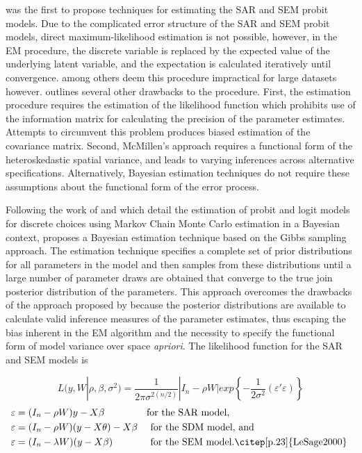 \cite{McMillen1992} was the first to propose techniques for estimating the SAR and SEM probit models.  Due to the complicated error structure of the SAR and SEM probit models, direct maximum-likelihood estimation is not possible, however, in the EM procedure, the discrete variable is replaced by the expected value of the underlying latent variable, and the expectation is calculated iteratively until convergence.  \cite{McMillen1992} among others deem this procedure impractical for large datasets however.  \cite{LeSage2000} outlines several other drawbacks to the procedure.  First, the estimation procedure requires the estimation of the likelihood function which prohibits  use of the information matrix for calculating the precision of the parameter estimates.  Attempts to circumvent this problem produces biased estimation of the covariance matrix.  Second, McMillen's approach requires a functional form of the heteroskedastic spatial variance, and leads to varying inferences across alternative specifications.  Alternatively, Bayesian estimation techniques do not require these assumptions about the functional form of the error process.

Following the work of \cite{Chib1992} and \cite{Albert1993} which detail the estimation of probit and logit models for discrete choices using Markov Chain Monte Carlo estimation in a Bayesian context, \cite{LeSage2000} proposes a Bayesian estimation  technique based on the Gibbs sampling approach.  The estimation technique specifies a complete set of prior distributions for all parameters in the model and then samples from these distributions until a large number of parameter draws are obtained that converge to the true join posterior distribution of the parameters.  This approach overcomes the drawbacks of the approach proposed by \cite{McMillen1992} because the posterior distributions are available to calculate valid inference measures of the parameter estimates, thus escaping the bias inherent in the EM algorithm and the necessity to specify the functional form of model variance over space \textit{apriori}. The likelihood function for the SAR and SEM models is

\begin{equation} \label{sarlikelihood}
 L(y,W|\rho,\beta ,\sigma^2)=\dfrac{1}{2\pi\sigma^{2(n/2)}}|I_n - \rho W|exp \left\lbrace -\frac{1}{2\sigma^2}(\varepsilon'\varepsilon)\right\rbrace 
\end{equation}
% 
\begin{align*}
 \varepsilon &= (I_n - \rho W)y - X\beta \qquad \qquad  \text{ for the SAR model,} \\
 \varepsilon &= (I_n - \rho W)(y - X\theta) - X\beta \quad  \text{ for the SDM model, and} \\
 \varepsilon &= (I_n - \lambda W)(y - X\beta) \qquad \;\;\quad \text{ for the SEM model.\citep[p.23]{LeSage2000} }
\end{align*}




